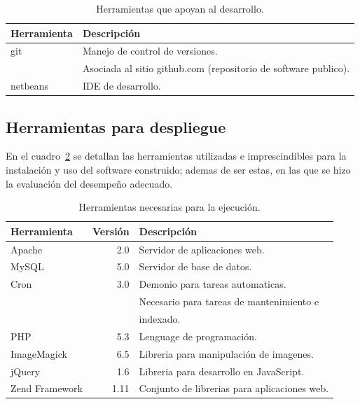 \documentclass[letter,12pt]{article}
\begin{document}
\begin{table}
\begin{tabular}{l|l}
Herramienta & Descripción \\
\hline
git & Manejo de control de versiones. \\
& Asociada al sitio github.com (repositorio de software publico). \\
netbeans & IDE de desarrollo. \\

\end{tabular}
\caption{Herramientas que apoyan al desarrollo.}
\label{herramientas_desarrollo}
\end{table}

\subsection{Herramientas para despliegue}
En el cuadro~\ref{herramientas_despliegue} se detallan las herramientas utilizadas e imprescindibles para la instalación
y uso del software construido; ademas de ser estas, en las que se hizo la evaluación del desempeño adecuado.

\begin{table}
\begin{tabular}{l|r|l}
Herramienta    & Versión & Descripción                                  \\
\hline
Apache         &     2.0 & Servidor de aplicaciones web.                \\
MySQL          &     5.0 & Servidor de base de datos.                   \\
Cron           &     3.0 & Demonio para tareas automaticas.             \\
               &         & Necesario para tareas de mantenimiento e     \\
               &         & indexado.                                    \\
PHP            &     5.3 & Lenguage de programación.                    \\
ImageMagick    &     6.5 & Libreria para manipulación de imagenes.      \\
jQuery         &     1.6 & Libreria para desarrollo en JavaScript.      \\
Zend Framework &    1.11 & Conjunto de librerias para aplicaciones web. \\
\end{tabular}
\caption{Herramientas necesarias para la ejecución.}
\label{herramientas_despliegue}
\end{table}
\end{document}
